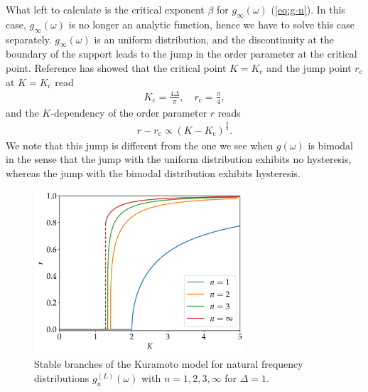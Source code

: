 What left to calculate is the critical exponent $\beta$
for $g_{\infty}(\omega)$ (\ref{eq:g-n}).
In this case,
$g_{\infty}(\omega)$ is no longer an analytic function,
hence we have to solve this case separately.
$g_{\infty}(\omega)$ is an uniform distribution,
and the discontinuity at the boundary of the support leads
to the jump in the order parameter at the critical point.
Reference \cite{basnarkov2007} has showed that the critical point $K=K_{\mathrm{c}}$
and the jump point $r_{\mathrm{c}}$ at $K=K_{\mathrm{c}}$ read
\begin{align}
  K_{\mathrm{c}}=\frac{4\Delta}{\pi},\quad r_{\mathrm{c}}=\frac{\pi}{4},
\end{align}
and the $K$-dependency of the order parameter $r$ reads
\begin{align}
  r-r_{\mathrm{c}}\propto(K-K_{\mathrm{c}})^{\frac{2}{3}}.
\end{align}
We note that this jump is different from the one we see
when $g(\omega)$ is bimodal \cite{martens2009,terada2017,yoneda2019} in the sense that
the jump with the uniform distribution exhibits no hysteresis,
whereas the jump with the bimodal distribution exhibits hysteresis.

\begin{figure}[htbp]
  \centering
  \includegraphics[width=0.7\textwidth]{figs/general_dist_bif_diagram.pdf}
  \caption{Stable branches of the Kuramoto model for natural frequency distributions $g_{n}^{(L)}(\omega)$ with $n=1,2,3,\infty$ for $\Delta=1$.}
  \label{fig:general_dist_bif_diagram}
\end{figure}

